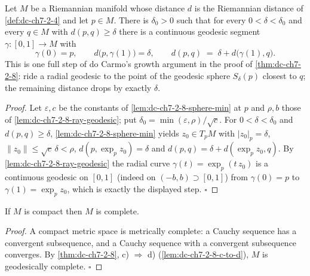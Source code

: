 \begin{lemma}
  \label{lem:dc-ch7-2-8-step}
  \leanok
  Let $M$ be a Riemannian manifold whose distance $d$ is the Riemannian
  distance of \cref{def:dc-ch7-2-4} and let $p\in M$. There is $\delta_0>0$
  such that for every $0<\delta<\delta_0$ and every $q\in M$ with
  $d(p,q)\ge\delta$ there is a continuous geodesic segment
  $\gamma:[0,1]\to M$ with
  $$
  \gamma(0)=p,\qquad d\big(p,\gamma(1)\big)=\delta,\qquad
  d(p,q)\;=\;\delta+d\big(\gamma(1),q\big).
  $$
  This is one full step of do Carmo's growth argument in the proof of
  \cref{thm:dc-ch7-2-8}: ride a radial geodesic to the point of the geodesic
  sphere $S_\delta(p)$ closest to $q$; the remaining distance drops by exactly
  $\delta$.
\end{lemma}
\begin{proof}
  \leanok
  Let $\varepsilon,c$ be the constants of \cref{lem:dc-ch7-2-8-sphere-min} at
  $p$ and $\rho,b$ those of \cref{lem:dc-ch7-2-8-ray-geodesic}; put
  $\delta_0=\min(\varepsilon,\rho)/\sqrt c$. For $0<\delta<\delta_0$ and
  $d(p,q)\ge\delta$, \cref{lem:dc-ch7-2-8-sphere-min} yields
  $z_0\in T_pM$ with $|z_0|_p=\delta$, $\|z_0\|\le\sqrt c\,\delta<\rho$,
  $d(p,\exp_p z_0)=\delta$ and $d(p,q)=\delta+d(\exp_p z_0,q)$. By
  \cref{lem:dc-ch7-2-8-ray-geodesic} the radial curve
  $\gamma(t)=\exp_p(t\,z_0)$ is a continuous geodesic on $[0,1]$ (indeed on
  $(-b,b)\supset[0,1]$) from $\gamma(0)=p$ to $\gamma(1)=\exp_p z_0$, which is
  exactly the displayed step. $\square$
\end{proof}

\begin{corollary}
  \label{cor:dc-ch7-2-9}
  \leanok
  If $M$ is compact then $M$ is complete.
\end{corollary}
\begin{proof}
  \leanok
  A compact metric space is metrically complete: a Cauchy sequence has a
  convergent subsequence, and a Cauchy sequence with a convergent subsequence
  converges. By \cref{thm:dc-ch7-2-8}, c) $\Rightarrow$ d)
  (\cref{lem:dc-ch7-2-8-c-to-d}), $M$ is geodesically complete. $\square$
\end{proof}

